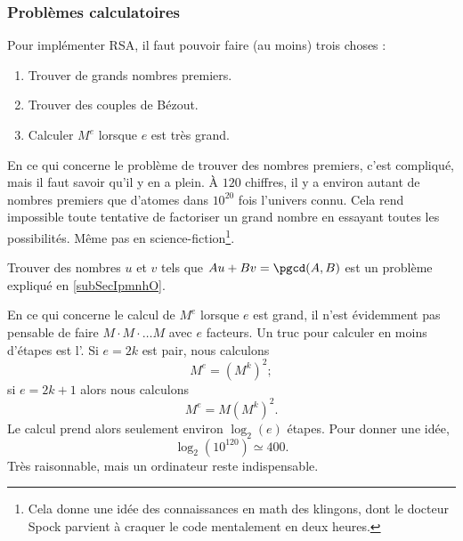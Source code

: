 \subsubsection{Problèmes calculatoires}

Pour implémenter RSA, il faut pouvoir faire (au moins) trois choses :
\begin{enumerate}
    \item
        Trouver de grands nombres premiers.
    \item
        Trouver des couples de Bézout.
    \item
        Calculer \( M^e\) lorsque \( e\) est très grand.
\end{enumerate}
En ce qui concerne le problème de trouver des nombres premiers, c'est compliqué, mais il faut savoir qu'il y en a plein. À \( 120\) chiffres, il y a environ autant de nombres premiers que d'atomes dans \( 10^{20}\) fois l'univers connu. Cela rend impossible toute tentative de factoriser un grand nombre en essayant toutes les possibilités. Même pas en science-fiction\footnote{Cela donne une idée des connaissances en math des klingons, dont le docteur Spock parvient à craquer le code mentalement en deux heures.}.

Trouver des nombres \( u\) et \( v\) tels que \( Au+Bv=\pgcd(A,B)\) est un problème expliqué en \ref{subSecIpmnhO}.

En ce qui concerne le calcul de \( M^e\) lorsque \( e\) est grand, il n'est évidemment pas pensable de faire \( M\cdot M\cdot\ldots M\) avec \( e\) facteurs. Un truc pour calculer en moins d'étapes est l'. Si \( e=2k\) est pair, nous calculons
\begin{equation}
    M^e=(M^k)^2;
\end{equation}
si \( e=2k+1\) alors nous calculons
\begin{equation}
    M^e=M(M^k)^2.
\end{equation}
Le calcul prend alors seulement environ \(  \log_2(e)  \) étapes. Pour donner une idée,
\begin{equation}
    \log_2(10^{120})\simeq 400.
\end{equation}
Très raisonnable, mais un ordinateur reste indispensable.

